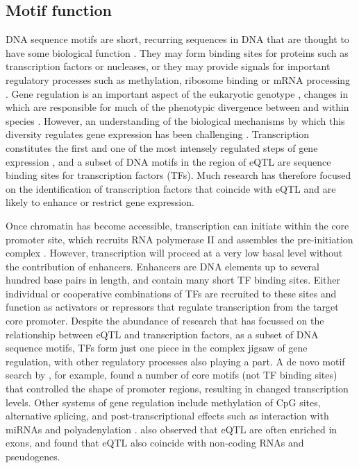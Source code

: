 \documentclass[12pt]{article}
\begin{document}
\subsection{Motif function}
DNA sequence motifs are short, recurring sequences in DNA that are thought to have some biological function \citep{d2006dna}. They may form binding sites for proteins such as transcription factors or nucleases, or they may provide signals for important regulatory processes such as methylation, ribosome binding or mRNA processing \citep{d2006dna}. Gene regulation is an important aspect of the eukaryotic genotype \citep{beckerman2005gene}, changes in which are responsible for much of the phenotypic divergence between and within species \citep{stewart2012transcription}. However, an understanding of the biological mechanisms by which this diversity regulates gene expression has been challenging  \citep{pai2015genetic, gaffney2013global}. Transcription constitutes the first and one of the most intensely regulated steps of gene expression \citep{zabidi2016regulatory}, and a subset of DNA motifs in the region of eQTL are sequence binding sites for transcription factors (TFs). Much research has therefore focused on the identification of transcription factors that coincide with eQTL and are likely to enhance or restrict gene expression. 

Once chromatin has become accessible, transcription can initiate within the core promoter site, which recruits RNA polymerase II and assembles the pre-initiation complex \citep{zabidi2016regulatory}. However, transcription will proceed at a very low basal level without the contribution of enhancers. Enhancers are DNA elements up to several hundred base pairs in length, and contain many short TF binding sites. Either individual or cooperative combinations of TFs are recruited to these sites and function as activators or repressors that regulate transcription from the target core promoter. Despite the abundance of research that has focussed on the relationship between eQTL and transcription factors, as a subset of DNA sequence motifs, TFs form just one piece in the complex jigsaw of gene regulation, with other regulatory processes also playing a part. A de novo motif search by \citet{schor2017promoter}, for example, found a number of core motifs (not TF binding sites) that controlled the shape of promoter regions, resulting in changed transcription levels. Other systems of gene regulation include methylation of CpG sites, alternative splicing, and post-transcriptional effects such as interaction with miRNAs and polyadenylation \citep{gaffney2013global}. \citet{gaffney2013global} also observed that eQTL are often enriched in exons, and \citet{kirsten2015dissecting} found that eQTL also coincide with non-coding RNAs and pseudogenes.
 
\end{document}
